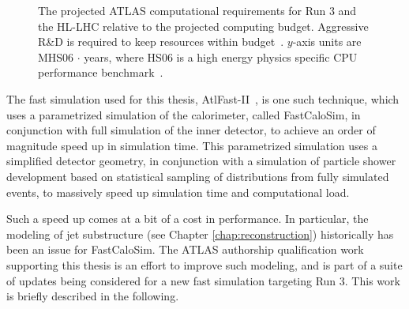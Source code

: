 \begin{figure}[ht]
\centering
{}
\caption{\label{fig:budget-plot} The projected ATLAS computational requirements for Run 3 and the HL-LHC 
relative to the projected computing budget. Aggressive R\&D is required to keep resources within 
budget~\cite{computing-budget}. $y$-axis units are MHS06 $\cdot$ years, where HS06 is a high energy 
physics specific CPU performance benchmark~\cite{HS06}.}
\end{figure}

The fast simulation used for this thesis, AtlFast-II~\cite{SOFT-2010-01}, is one such technique, which uses
a parametrized simulation of the calorimeter, called FastCaloSim, in conjunction with full simulation of the 
inner detector, to achieve an order of magnitude speed up in simulation time. This parametrized simulation uses 
a simplified detector geometry, in conjunction with a simulation of particle shower development based on statistical 
sampling of distributions from fully simulated events, to massively speed up simulation time and computational load.

Such a speed up comes at a bit of a cost in performance. In particular, the modeling of jet substructure (see Chapter 
\ref{chap:reconstruction}) historically has been an issue for FastCaloSim. The ATLAS authorship qualification work 
supporting this thesis is an effort to improve such modeling, and is part of a suite of updates being considered for 
a new fast simulation targeting Run 3. This work is briefly described in the following.

\FloatBarrier
